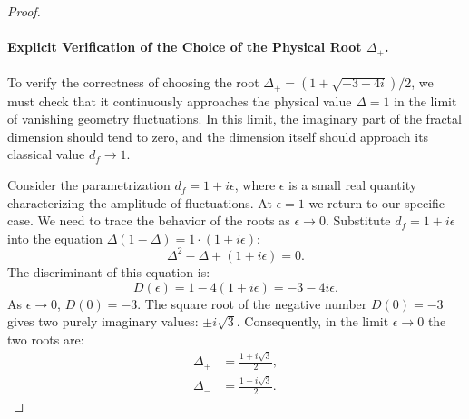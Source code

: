\documentclass[12pt,a4paper]{article}
\begin{document}
\begin{proof}
		\paragraph{Explicit Verification of the Choice of the Physical Root \(\Delta_+\).}
		To verify the correctness of choosing the root \(\Delta_+ = (1 + \sqrt{-3 - 4i})/2\), we must check that it continuously approaches the physical value \(\Delta = 1\) in the limit of vanishing geometry fluctuations. In this limit, the imaginary part of the fractal dimension should tend to zero, and the dimension itself should approach its classical value \(d_f \to 1\).
		
		Consider the parametrization \(d_f = 1 + i\epsilon\), where \(\epsilon\) is a small real quantity characterizing the amplitude of fluctuations. At \(\epsilon = 1\) we return to our specific case. We need to trace the behavior of the roots as \(\epsilon \to 0\). Substitute \(d_f = 1 + i\epsilon\) into the equation \(\Delta(1 - \Delta) = 1 \cdot (1 + i\epsilon)\):
		\begin{equation}
			\Delta^2 - \Delta + (1 + i\epsilon) = 0.
			\label{eq:quadratic_eps}
		\end{equation}
		The discriminant of this equation is:
		\begin{equation}
			D(\epsilon) = 1 - 4(1 + i\epsilon) = -3 - 4i\epsilon.
		\end{equation}
		As \(\epsilon \to 0\), \(D(0) = -3\). The square root of the negative number \(D(0) = -3\) gives two purely imaginary values: \(\pm i\sqrt{3}\). Consequently, in the limit \(\epsilon \to 0\) the two roots are:
		\begin{align}
			\Delta_+ &= \frac{1 + i\sqrt{3}}{2},\\
			\Delta_- &= \frac{1 - i\sqrt{3}}{2}.
		\end{align}

\end{proof}
\end{document}
